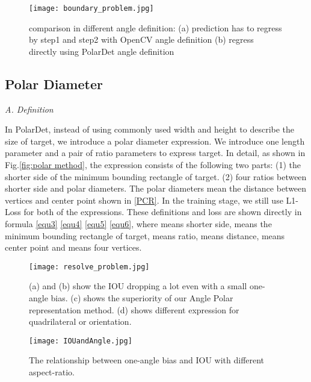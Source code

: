 \documentclass[10pt,twocolumn]{article}
\begin{document}
\begin{figure}[!tb]	
	\centering
\texttt{[image: boundary\_problem.jpg]}
	\caption{comparison in different angle definition: (a) prediction has to regress by step1 and step2 with OpenCV angle definition (b) regress directly using PolarDet angle definition}
	\label{fig:boundary problem}
\end{figure}

\subsection{Polar Diameter}\label{polar_diameter}
\emph{A. Definition}

In PolarDet, instead of using commonly used width and height to describe the size of target, we introduce a polar diameter expression. We introduce one length parameter and a pair of ratio parameters  to express target. In detail, as shown in Fig.\ref{fig:polar method}, the expression consists of the following two parts: (1) the shorter side of the minimum bounding rectangle of target. (2) four ratios between shorter side and polar diameters. The polar diameters mean the distance between vertices and center point shown in \ref{PCR}. In the training stage, we still use L1-Loss for both of the expressions. These definitions and loss are shown directly in formula \ref{equ3} \ref{equ4} \ref{equ5} \ref{equ6}, where  means shorter side,  means the minimum bounding rectangle of target,  means ratio,  means  distance,  means center point and  means four vertices.





\begin{figure}[!tb]	
	\centering
\texttt{[image: resolve\_problem.jpg]}
	\caption{(a) and (b) show the IOU dropping a lot even with a small one-angle bias. (c) shows the superiority of our Angle Polar representation method. (d) shows different expression for quadrilateral or orientation.}
	\label{fig:resolve problem}
\end{figure}
\begin{figure}[!tb]	
	\centering
\texttt{[image: IOUandAngle.jpg]}
	\caption{The relationship between one-angle bias and IOU with different aspect-ratio.}
	\label{fig:IOUandAngle}
\end{figure}
\end{document}
